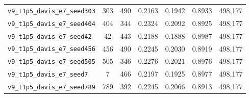 \begin{table}[!h]
\begin{tabular}{p{4.8cm}cccccc}
\texttt{v9\_\allowbreak{}t1p5\_\allowbreak{}davis\_\allowbreak{}e7\_\allowbreak{}seed303} & 303 & 490 & 0.2163 & 0.1942 & 0.8933 & 498,177 \\
\texttt{v9\_\allowbreak{}t1p5\_\allowbreak{}davis\_\allowbreak{}e7\_\allowbreak{}seed404} & 404 & 344 & 0.2324 & 0.2092 & 0.8925 & 498,177 \\
\texttt{v9\_\allowbreak{}t1p5\_\allowbreak{}davis\_\allowbreak{}e7\_\allowbreak{}seed42} & 42 & 443 & 0.2188 & 0.1888 & 0.8987 & 498,177 \\
\texttt{v9\_\allowbreak{}t1p5\_\allowbreak{}davis\_\allowbreak{}e7\_\allowbreak{}seed456} & 456 & 490 & 0.2245 & 0.2030 & 0.8919 & 498,177 \\
\texttt{v9\_\allowbreak{}t1p5\_\allowbreak{}davis\_\allowbreak{}e7\_\allowbreak{}seed505} & 505 & 346 & 0.2276 & 0.2021 & 0.8976 & 498,177 \\
\texttt{v9\_\allowbreak{}t1p5\_\allowbreak{}davis\_\allowbreak{}e7\_\allowbreak{}seed7} & 7 & 466 & 0.2197 & 0.1925 & 0.8977 & 498,177 \\
\texttt{v9\_\allowbreak{}t1p5\_\allowbreak{}davis\_\allowbreak{}e7\_\allowbreak{}seed789} & 789 & 392 & 0.2245 & 0.2066 & 0.8913 & 498,177 \\
\bottomrule
\end{tabular}
\end{table}

